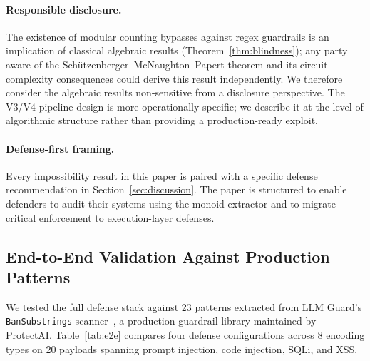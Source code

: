 \documentclass[letterpaper,twocolumn,10pt]{article}
\theoremstyle{definition}
\theoremstyle{remark}
\begin{document}
\paragraph{Responsible disclosure.}
The existence of modular counting bypasses against regex guardrails is an
implication of classical algebraic results (Theorem~\ref{thm:blindness}); any
party aware of the Sch\"{u}tzenberger--McNaughton--Papert theorem and its circuit
complexity consequences could derive this result independently.
We therefore consider the algebraic results non-sensitive from a disclosure
perspective.
The V3/V4 pipeline design is more operationally specific; we describe it at the
level of algorithmic structure rather than providing a production-ready exploit.

\paragraph{Defense-first framing.}
Every impossibility result in this paper is paired with a specific defense
recommendation in Section~\ref{sec:discussion}.
The paper is structured to enable defenders to audit their systems using the monoid
extractor and to migrate critical enforcement to execution-layer defenses.

\subsection{End-to-End Validation Against Production Patterns}\label{sec:e2e}

We tested the full defense stack against 23 patterns extracted from LLM
Guard's \texttt{BanSubstrings} scanner~\cite{llmguard2024}, a production
guardrail library maintained by ProtectAI.
Table~\ref{tab:e2e} compares four defense configurations across 8 encoding types
on 20 payloads spanning prompt injection, code injection, SQLi, and XSS.
\end{document}
